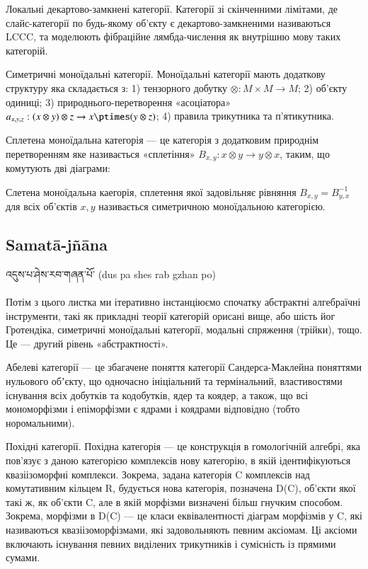 Локальні декартово-замкнені категорії. Категорії зі скінченними лімітами,
де слайс-категорії по будь-якому об'єкту є декартово-замкненими називаються LCCC,
та моделюють фібраційне лямбда-числення як внутрішню мову таких категорій.

Симетричні моноїдальні категорії. Моноїдальні категорії мають додаткову
структуру яка складається з: 1) тензорного добутку $\otimes: M \times M \rightarrow M$;
2) об'єкту одиниці; 3) природнього-перетворення «асоціатора»
$a_{x,y,z}: (x\otimes y)\otimes z \rightarrow x\ptimes(y \otimes z)$;
4) правила трикутника та п'ятикутника.

Сплетена моноїдальна
категорія --- це категорія з додатковим природнім перетворенням
яке називається «сплетіння» $B_{x,y} : x\otimes y \rightarrow y\otimes x$,
таким, що комутують дві діаграми:

Слетена моноїдальна каегорія, сплетення якої задовільняє
рівняння $B_{x,y} = B^{-1}_{y,x}$ для всіх об'єктів $x,y$ називається
симетричною моноїдальною категорією.

\subsection*{Samatā-jñāna}

\ti འདུས་པ་ཤེས་རབ་གཞན་པོ་ \ua (dus pa shes rab gzhan po)\\
\\
Потім з цього листка ми ітеративно інстанціюємо спочатку абстрактні
алгебраїчні інструменти, такі як прикладні теорії категорій орисані
вище, або шість йог Гротендіка, симетричні моноїдальні категорії,
модальні спряження (трійки), тощо. Це — другий рівень «абстрактності».

Абелеві категорії — це збагачене поняття категорії Сандерса-Маклейна
поняттями нульового обʼєкту, що одночасно ініціальний та термінальний,
властивостями існування всіх добутків та кодобутків, ядер та коядер, а
також, що всі мономорфізми і епіморфізми є ядрами і коядрами
відповідно (тобто норомальними).

Похідні категорії. Похідна категорія --- це конструкція в гомологічній
алгебрі, яка пов'язує з даною категорією комплексів нову категорію,
в якій ідентифікуються квазіізоморфні комплекси. Зокрема, задана
категорія C комплексів над комутативним кільцем R, будується нова
категорія, позначена D(C), об'єкти якої такі ж, як об'єкти C, але
в якій морфізми визначені більш гнучким способом. Зокрема, морфізми
в D(C) — це класи еквівалентності діаграм морфізмів у C, які
називаються квазіізоморфізмами, які задовольняють певним аксіомам.
Ці аксіоми включають існування певних виділених трикутників і
сумісність із прямими сумами.

